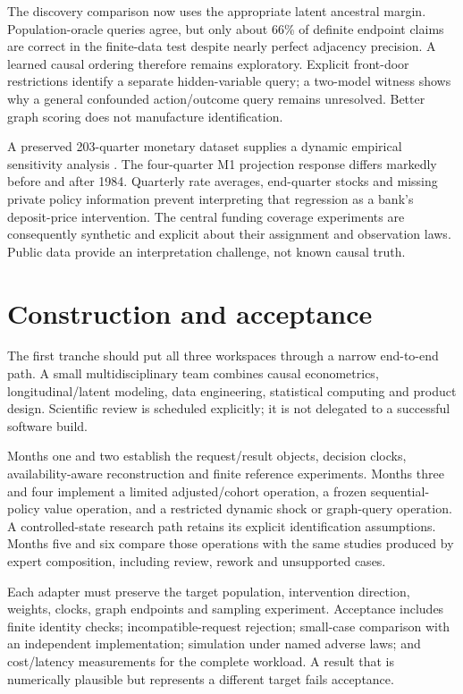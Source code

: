 \documentclass[11pt,a4paper,openany]{book}
\begin{document}
The discovery comparison now uses the appropriate latent ancestral margin.
Population-oracle queries agree, but only about 66\% of definite endpoint
claims are correct in the finite-data test despite nearly perfect adjacency
precision. A learned causal ordering therefore remains exploratory.
Explicit front-door restrictions identify a separate hidden-variable query;
a two-model witness shows why a general confounded action/outcome query
remains unresolved. Better graph scoring does not manufacture identification.

A preserved 203-quarter monetary dataset supplies a dynamic empirical
sensitivity analysis \citep{public_macrodata_dynamic}. The four-quarter M1
projection response differs markedly before and after 1984. Quarterly rate
averages, end-quarter stocks and missing private policy information prevent
interpreting that regression as a bank's deposit-price intervention. The
central funding coverage experiments are consequently synthetic and explicit
about their assignment and observation laws. Public data provide an
interpretation challenge, not known causal truth.

\chapter{Construction and acceptance}

The first tranche should put all three workspaces through a narrow
end-to-end path. A small multidisciplinary team combines causal
econometrics, longitudinal/latent modeling, data engineering, statistical
computing and product design. Scientific review is scheduled explicitly;
it is not delegated to a successful software build.

Months one and two establish the request/result objects, decision clocks,
availability-aware reconstruction and finite reference experiments.
Months three and four implement a limited adjusted/cohort operation,
a frozen sequential-policy value operation, and a restricted dynamic
shock or graph-query operation. A controlled-state research path retains
its explicit identification assumptions. Months five and six compare
those operations with the same studies produced by expert composition,
including review, rework and unsupported cases.

Each adapter must preserve the target population, intervention direction,
weights, clocks, graph endpoints and sampling experiment. Acceptance
includes finite identity checks; incompatible-request rejection;
small-case comparison with an independent implementation; simulation
under named adverse laws; and cost/latency measurements for the complete
workload. A result that is numerically plausible but represents a different
target fails acceptance.
\end{document}
